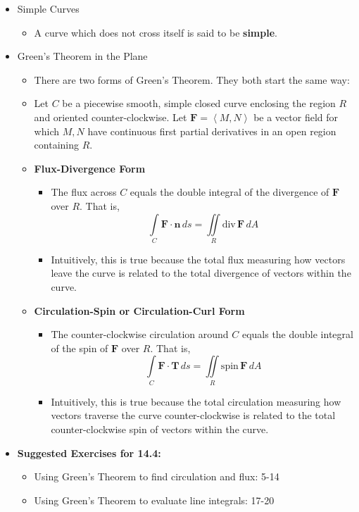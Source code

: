 \documentclass[12pt]{article}
\theoremstyle{plain}
\theoremstyle{definition}
\theoremstyle{remark}
\newcommand{\vect}[1]{\mathbf{#1}}
\newcommand{\dvar}[1]{\,d{#1}}
\renewcommand{\div}{\textrm{div}\,}
\newcommand{\spin}{\textrm{spin}\,}
\begin{document}
\begin{itemize}
	\item Simple Curves
		\begin{itemize}
		\item A curve which does not cross itself is said to be \textbf{simple}.
		\end{itemize}
	\newpage
	\item Green's Theorem in the Plane
		\begin{itemize}
		\item There are two forms of Green's Theorem. They both start the same way:
		\item Let $C$ be a piecewise smooth, simple closed curve enclosing the region $R$ and oriented counter-clockwise. Let $\vect{F}=\left<M,N\right>$ be a vector field for which $M,N$ have continuous first partial derivatives in an open region containing $R$.
		\item \textbf{Flux-Divergence Form}
			\begin{itemize}
			\item The flux across $C$ equals the double integral of the divergence of $\vect{F}$ over $R$. That is, \[\int\limits_C \vect{F}\cdot\vect{n}\,ds = \iint\limits_R \div \vect{F}\dvar{A}\]
			\item Intuitively, this is true because the total flux measuring how vectors leave the curve is related to the total divergence of vectors within the curve.
			\end{itemize}
		\item \textbf{Circulation-Spin or Circulation-Curl Form}
			\begin{itemize}
			\item The counter-clockwise circulation around $C$ equals the double integral of the spin of $\vect{F}$ over $R$. That is, \[\int\limits_C \vect{F}\cdot\vect{T}\dvar{s} = \iint\limits_R \spin \vect{F}\dvar{A}\]
			\item Intuitively, this is true because the total circulation measuring how vectors traverse the curve counter-clockwise is related to the total counter-clockwise spin of vectors within the curve.
			\end{itemize}
		\end{itemize}
		
	\item \textbf{Suggested Exercises for 14.4:}
	
		\begin{itemize}
		\item Using Green's Theorem to find circulation and flux: 5-14
		\item Using Green's Theorem to evaluate line integrals: 17-20
		\end{itemize}
		
	\end{itemize}
	
\end{document}
